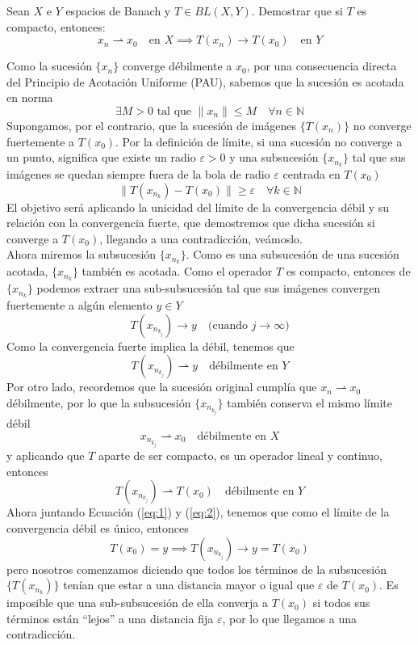 \begin{ejercicio}
    Sean $X$ e $Y$ espacios de Banach y $T \in BL(X,Y)$. Demostrar que si $T$ es compacto, entonces:
    \[ x_n \rightharpoonup x_0 \quad \text{en } X \implies T(x_n) \longrightarrow T(x_0) \quad \text{en } Y \] 

    \noindent
    Como la sucesión $\{x_n\}$ converge débilmente a $x_0$, por una consecuencia directa del Principio de Acotación Uniforme (PAU), sabemos que la sucesión es acotada en norma
    $$ \exists M > 0 \text{ tal que } \|x_n\| \le M \quad \forall n \in \mathbb{N} $$
    Supongamos, por el contrario, que la sucesión de imágenes $\{T(x_n)\}$ no converge fuertemente a $T(x_0)$. Por la definición de límite, si una sucesión no converge a un punto, significa que existe un radio $\varepsilon > 0$ y una subsucesión $\{x_{n_k}\}$ tal que sus imágenes se quedan siempre fuera de la bola de radio $\varepsilon$ centrada en $T(x_0)$
    $$ \|T(x_{n_k}) - T(x_0)\| \ge \varepsilon \quad \forall k \in \mathbb{N} $$
    El objetivo será aplicando la unicidad del límite de la convergencia débil y su relación con la convergencia fuerte, que demostremos que dicha sucesión si converge a $T(x_0)$, llegando a una contradicción, veámoslo. \\

    \noindent
    Ahora miremos la subsucesión $\{x_{n_k}\}$. Como es una subsucesión de una sucesión acotada, $\{x_{n_k}\}$ también es acotada. Como el operador $T$ es compacto, entonces de $\{x_{n_k}\}$ podemos extraer una sub-subsucesión tal que sus imágenes convergen fuertemente a algún elemento $y \in Y$
    $$ T(x_{n_{k_j}}) \longrightarrow y \quad \text{(cuando } j \to \infty) $$
    Como la convergencia fuerte implica la débil, tenemos que
    \begin{equation}\label{eq:2}
        T(x_{n_{k_j}}) \rightharpoonup y \quad \text{débilmente en } Y 
    \end{equation}
    Por otro lado, recordemos que la sucesión original cumplía que $x_n \rightharpoonup x_0$ débilmente, por lo que la subsucesión $\{x_{n_{k_j}}\}$ también conserva el mismo límite débil
    $$ x_{n_{k_j}} \rightharpoonup x_0 \quad \text{débilmente en } X $$
    y aplicando que $T$ aparte de ser compacto, es un operador lineal y continuo, entonces
    \begin{equation}\label{eq:1}
        T(x_{n_{k_j}}) \rightharpoonup T(x_0) \quad \text{débilmente en } Y
    \end{equation}
    Ahora juntando Ecuación (\ref{eq:1}) y (\ref{eq:2}), tenemos que como el límite de la convergencia débil es único, entonces
    \begin{equation*}
        T(x_0)=y\implies T(x_{n_{k_j}}) \longrightarrow y=T(x_0)
    \end{equation*}
    pero nosotros comenzamos diciendo que todos los términos de la subsucesión $\{T(x_{n_k})\}$ tenían que estar a una distancia mayor o igual que $\varepsilon$ de $T(x_0)$. Es imposible que una sub-subsucesión de ella converja a $T(x_0)$ si todos sus términos están ``lejos'' a una distancia fija $\varepsilon$, por lo que llegamos a una contradicción. \\


\end{ejercicio}
